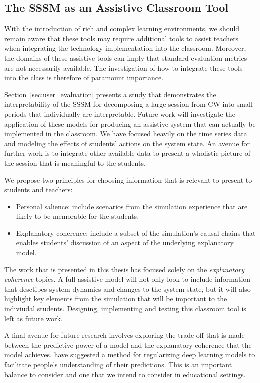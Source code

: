 \subsection{The SSSM as an Assistive Classroom Tool}\label{sec:class-assistive}
With the introduction of rich and complex learning environments, we should remain aware that these tools may require additional tools to assist teachers when integrating the technology implementation into the classroom. Moreover, the domains of these assistive tools can imply that standard evaluation metrics are not necessarily available. The investigation of how to integrate these tools into the class is therefore of paramount importance.

Section~\ref{sec:user_evaluation} presents a study that demonstrates the interpretability of the SSSM for decomposing a large session from CW into small periods that individually are interpretable. Future work will investigate the application of these models for producing an assistive system that can actually be implemented in the classroom. We have focused heavily on the time series data and modeling the effects of students' actions on the system state. An avenue for further work is to integrate other available data to present a wholistic picture of the session that is meaningful to the students.

We propose two principles for choosing information that is relevant to present to students and teachers:
\begin{itemize}
  \item Personal salience: include scenarios from the simulation experience that are likely to be memorable for the students.
  \item Explanatory coherence: include a subset of the simulation’s causal chains that enables students’ discussion of an aspect of the underlying explanatory model.
\end{itemize}

The work that is presented in this thesis has focused solely on the \textit{explanatory coherence} topics. A full assistive model will not only look to include information that desctibes system dynamics and changes to the system state, but it will also highlight key elements from the simulation that will be important to the indiviudal students. Designing, implementing and testing this classroom tool is left as future work.

A final avenue for future research involves exploring the trade-off that is made between the predictive power of a model and the explanatory coherence that the model achieves. \cite{wu2017beyond} have suggested a method for regularizing deep learning models to facilitate people's understanding of their predictions. This is an important balance to consider and one that we intend to consider in educational settings.


